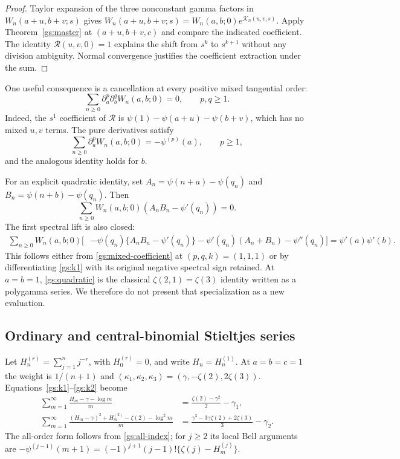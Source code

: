 \begin{proof}
Taylor expansion of the three nonconstant gamma factors in
$W_n(a+u,b+v;s)$ gives
$W_n(a+u,b+v;s)=W_n(a,b;0)e^{\mathcal K_n(u,v,s)}$.
Apply Theorem~\ref{gs:master} at $(a+u,b+v,c)$ and compare the indicated
coefficient.  The identity $\mathcal R(u,v,0)=1$ explains the shift from
$s^k$ to $s^{k+1}$ without any division ambiguity.  Normal convergence
justifies the coefficient extraction under the sum.
\end{proof}

One useful consequence is a cancellation at every positive mixed
tangential order:
\begin{equation}\label{gs:tangential}
 \sum_{n\ge0}\partial_a^p\partial_b^q W_n(a,b;0)=0,
 \qquad p,q\ge1.
\end{equation}
Indeed, the $s^1$ coefficient of $\mathcal R$ is
$\psi(1)-\psi(a+u)-\psi(b+v)$, which has no mixed $u,v$ terms.
The pure derivatives satisfy
\begin{equation}\label{gs:pure-tangential}
 \sum_{n\ge0}\partial_a^p W_n(a,b;0)=-\psi^{(p)}(a),
 \qquad p\ge1,
\end{equation}
and the analogous identity holds for $b$.

For an explicit quadratic identity, set
$A_n=\psi(n+a)-\psi(q_n)$ and
$B_n=\psi(n+b)-\psi(q_n)$.  Then
\begin{equation}\label{gs:quadratic}
 \sum_{n\ge0}W_n(a,b;0)
 \left(A_nB_n-\psi'(q_n)\right)=0.
\end{equation}
The first spectral lift is also closed:
\begin{align}
 \sum_{n\ge0}W_n(a,b;0)\bigl[&-\psi(q_n)
             \{A_nB_n-\psi'(q_n)\}
 -\psi'(q_n)(A_n+B_n)-\psi''(q_n)\bigr]
 =\psi'(a)\psi'(b).\label{gs:quadratic-lift}
\end{align}
This follows either from \eqref{gs:mixed-coefficient} at $(p,q,k)=(1,1,1)$
or by differentiating \eqref{gs:k1} with its original negative spectral
sign retained.  At $a=b=1$, \eqref{gs:quadratic} is the classical
$\zeta(2,1)=\zeta(3)$ identity written as a polygamma series.  We therefore
do not present that specialization as a new evaluation.

\subsection{Ordinary and central-binomial Stieltjes series}

Let $H_n^{(r)}=\sum_{j=1}^n j^{-r}$, with $H_0^{(r)}=0$, and write
$H_n=H_n^{(1)}$.  At $a=b=c=1$ the weight is $1/(n+1)$ and
$(\kappa_1,\kappa_2,\kappa_3)=(\gamma,-\zeta(2),2\zeta(3))$.
Equations~\eqref{gs:k1}--\eqref{gs:k2} become
\begin{align}
 \sum_{m=1}^{\infty}\frac{H_m-\gamma-\log m}{m}
 &=\frac{\zeta(2)-\gamma^2}{2}-\gamma_1,\label{gs:ordinary1}\\
 \sum_{m=1}^{\infty}
 \frac{(H_m-\gamma)^2+H_m^{(2)}-\zeta(2)-\log^2m}{m}
 &=\frac{\gamma^3-3\gamma\zeta(2)+2\zeta(3)}3-\gamma_2.
 \label{gs:ordinary2}
\end{align}
The all-order form follows from \eqref{gs:all-index}; for $j\ge2$ its
local Bell arguments are
$-\psi^{(j-1)}(m+1)=(-1)^{j+1}(j-1)!
\{\zeta(j)-H_m^{(j)}\}$.


